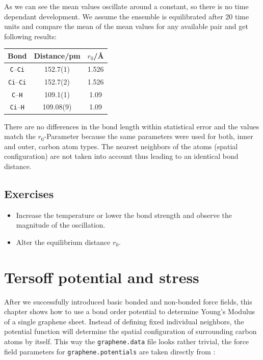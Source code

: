 As we can see the mean values oscillate around a constant, so there is
no time dependant development. We assume the ensemble is equilibrated
after 20 time units and compare the mean of the mean values for any
available pair and get following results:

\begin{center}
    \begin{tabular}{ccc}
        \toprule
        Bond & Distance/\si{\pico\meter} & $r_0$/\si{\angstrom} \\
        \midrule
        \texttt{C}--\texttt{Ci} & 152.7(1) & 1.526 \\
        \texttt{Ci}--\texttt{Ci} & 152.7(2) & 1.526 \\
        \texttt{C}--\texttt{H} & 109.1(1) & 1.09 \\
        \texttt{Ci}--\texttt{H} & 109.08(9) & 1.09 \\
        \bottomrule
    \end{tabular}
\end{center}

There are no differences in the bond length within statistical error and
the values match the $r_0$-Parameter because the same parameters were
used for both, inner and outer, carbon atom types. The nearest neighbors
of the atoms (spatial configuration) are not taken into account thus
leading to an identical bond distance. 

\subsection{Exercises}
\begin{itemize}
    \item Increase the temperature or lower the bond strength and
        observe the magnitude of the oscillation.
    \item Alter the equilibrium distance $r_0$.
\end{itemize}

\section{Tersoff potential and stress}
After we successfully introduced basic bonded and non-bonded force fields, this
chapter shows how to use a bond order potential to determine Young's Modulus of
a single graphene sheet. Instead of defining fixed individual neighbors, the
potential function will determine the spatial configuration of surrounding
carbon atoms by itself. This way the \texttt{graphene.data} file looks rather trivial,
the force field parameters for \texttt{graphene.potentials} are taken directly
from \cite{tersoff88a}:

